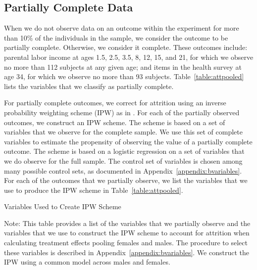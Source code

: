 \subsection{Partially Complete Data}
\label{app:method_partialobs}

When we do not observe data on an outcome within the experiment for more than 10\% of the individuals in the sample, we consider the outcome to be partially complete. Otherwise, we consider it complete. These outcomes include: parental labor income at ages 1.5, 2.5, 3.5, 8, 12, 15, and 21, for which we observe no more than 112 subjects at any given age; and items in the health survey at age 34, for which we observe no more than 93 subjects. Table~\ref{table:attpooled} lists the variables that we classify as partially complete.

\noindent For partially complete outcomes, we correct for attrition using an inverse probability weighting scheme (IPW) as in  \citet{Horvitz_Thompson_1952_JASA}. For each of the partially observed outcomes, we construct an IPW scheme. The scheme is based on a set of variables that we observe for the complete sample. We use this set of complete variables to estimate the propensity of observing the value of a partially complete outcome.  The scheme is based on a logistic regression on a set of variables that we do observe for the full sample. The control set of variables is chosen among many possible control sets,  as documented in Appendix~\ref{appendix:bvariables}. For each of the outcomes that we partially observe, we list the variables that we use to produce the IPW scheme in Table~\ref{table:attpooled}.

\begin{table}
\begin{threeparttable}
\caption{Variables Used to Create IPW Scheme}
\label{table:attpooled}
\centering

\begin{tablenotes}
\footnotesize
\item Note: This table provides a list of the variables that we partially observe and the variables that we use to construct the IPW scheme to account for attrition when calculating treatment effects pooling females and males. The procedure to select these variables is described in Appendix~\ref{appendix:bvariables}. We construct the IPW using a common model across males and females.
\end{tablenotes}
\end{threeparttable}
\end{table}
\restoregeometry
\doublespacing

